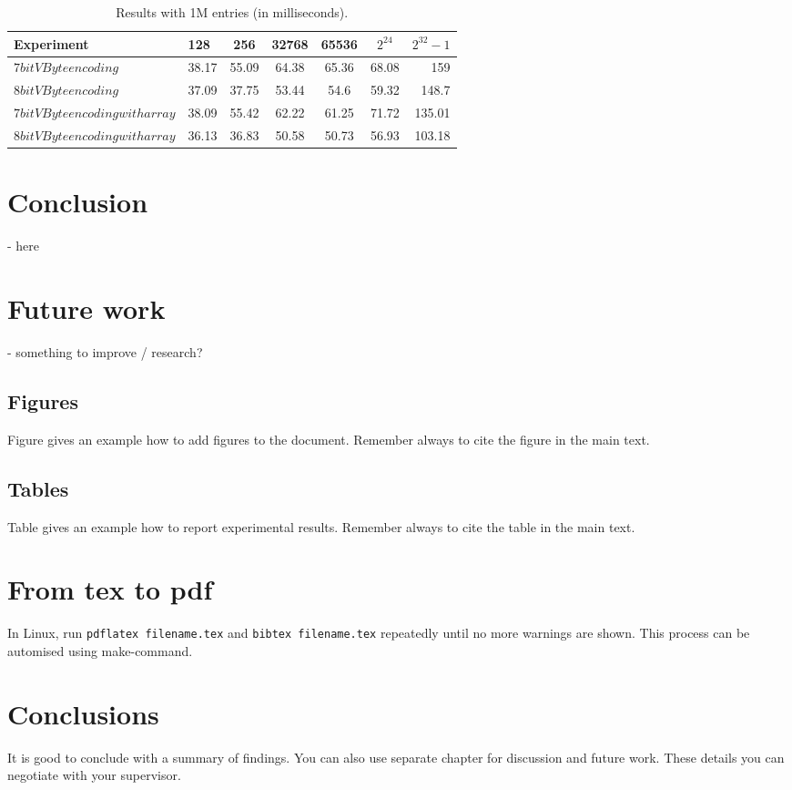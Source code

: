 \begin{table}
\centering
\caption{Results with 1M entries (in milliseconds).\label{table:results2}}
\begin{tabular}{l||l c c c c r} 
Experiment & 128 & 256 & 32768 & 65536 & $2^{24}$ & $2^{32} -1$ \\ 
\hline \hline 
$7bit VByte encoding$ & 38.17 & 55.09 & 64.38 & 65.36 & 68.08 & 159 \\
$8bit VByte encoding$ & 37.09 & 37.75 & 53.44 & 54.6 & 59.32 & 148.7\\
$7bit VByte encoding with array$ & 38.09 & 55.42 & 62.22 & 61.25 & 71.72 & 135.01\\
$8bit VByte encoding with array$ & 36.13 & 36.83 & 50.58 & 50.73 & 56.93 & 103.18\\

\hline
%
\end{tabular}
\end{table}

\chapter{Conclusion}
 - here

\chapter{Future work}
 - something to improve / research?


\section{Figures}
Figure gives an example how to add figures to the document. Remember always to cite the figure in the main text.


\section{Tables}

Table gives an example how to report experimental results. Remember always to cite the table in the main text. 


\chapter{From tex to pdf}

In Linux, run \texttt{pdflatex filename.tex} and \texttt{bibtex filename.tex} repeatedly until no more warnings are shown. This process can be automised using make-command.
 
\chapter{Conclusions\label{chapter:conclusions}}

It is good to conclude with a summary of findings. You can also use separate chapter for discussion and future work. These details you can negotiate with your supervisor.

